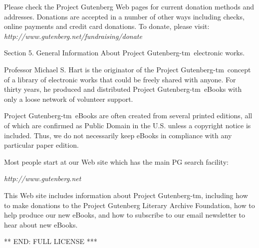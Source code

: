 \documentclass[11pt]{book}
\newcommand{\pgtm}{Project \mbox{Gutenberg-tm}}
\begin{document}
{\smallskip\noindent Please check the Project Gutenberg Web pages for current donation
methods and addresses.  Donations are accepted in a number of other
ways including checks, online payments and credit card donations.  To
donate, please visit: {\em http://www.gutenberg.net/fundraising/donate}


\medskip\noindent Section 5.  General Information About \pgtm\ electronic
works.

\smallskip\noindent Professor Michael S. Hart is the originator of the \pgtm\ 
concept of a library of electronic works that could be freely shared
with anyone.  For thirty years, he produced and distributed
\pgtm\ eBooks with only a loose network of volunteer support.

\smallskip\noindent \pgtm\ eBooks are often created from several printed
editions, all of which are confirmed as Public Domain in the U.S.
unless a copyright notice is included.  Thus, we do not necessarily
keep eBooks in compliance with any particular paper edition.

\smallskip\noindent Most people start at our Web site which has the
main PG search facility:

\smallskip\noindent\hspace*{3em}\em{http://www.gutenberg.net}

\smallskip\noindent This Web site includes information about \pgtm,
including how to make donations to the Project Gutenberg Literary Archive
Foundation, how to help produce our new eBooks, and how to subscribe
to our email newsletter to hear about new eBooks.

\smallskip\noindent *** END: FULL LICENSE ***}
\end{document}
